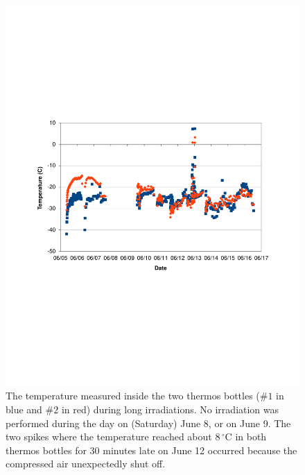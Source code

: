 \begin{figure}
\begin{center}
\includegraphics[width=5in]{comp_temp.pdf}
\caption{The temperature measured inside the two thermos bottles ($\#1$ in blue and $\#2$ in red) during long irradiations.
No irradiation was performed during the day on (Saturday) June 8, or on June 9.
The two spikes where the temperature reached about $8\,^{\circ}$C in both thermos bottles for 30 minutes late on June 12 occurred because the compressed air unexpectedly shut off.}
\label{fig:Temperature_History}
\end{center}
\end{figure}

